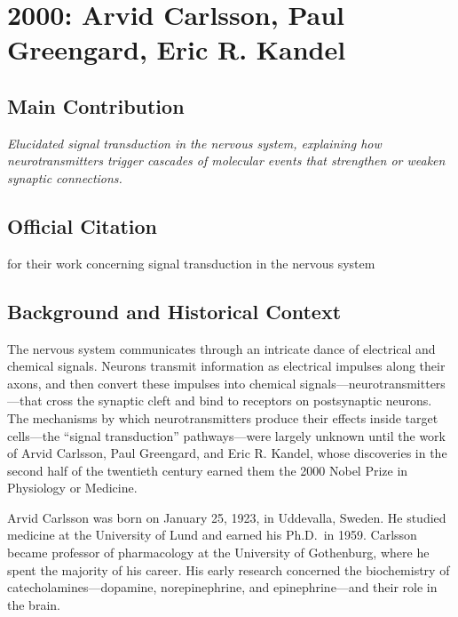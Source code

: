 \chapter[2000 --- Carlsson et al.]{2000: Arvid Carlsson, Paul Greengard, Eric R. Kandel}
\label{ch:2000_Carlsson}

\section*{Main Contribution}

\textit{Elucidated signal transduction in the nervous system, explaining how neurotransmitters trigger cascades of molecular events that strengthen or weaken synaptic connections.}\cite{nobel-2000,lecture-2000}

\section{Official Citation}

for their work concerning signal transduction in the nervous system

\section{Background and Historical Context}

The nervous system communicates through an intricate dance of electrical and chemical signals. Neurons transmit information as electrical impulses along their axons, and then convert these impulses into chemical signals---neurotransmitters---that cross the synaptic cleft and bind to receptors on postsynaptic neurons. The mechanisms by which neurotransmitters produce their effects inside target cells---the ``signal transduction'' pathways---were largely unknown until the work of Arvid Carlsson, Paul Greengard, and Eric R. Kandel, whose discoveries in the second half of the twentieth century earned them the 2000 Nobel Prize in Physiology or Medicine.

Arvid Carlsson was born on January 25, 1923, in Uddevalla, Sweden. He studied medicine at the University of Lund and earned his Ph.D.\ in 1959. Carlsson became professor of pharmacology at the University of Gothenburg, where he spent the majority of his career. His early research concerned the biochemistry of catecholamines---dopamine, norepinephrine, and epinephrine---and their role in the brain.

